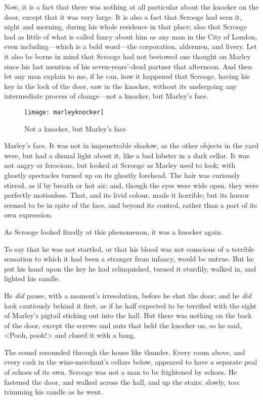 Now, it is a fact that there was nothing at all particular about the knocker on the door, except that it was very large. It is also a fact that Scrooge had seen it, night and morning, during his whole residence in that place; also that Scrooge had as little of what is called fancy about him as any man in the City of London, even including—which is a bold word—the corporation, aldermen, and livery. Let it also be borne in mind that Scrooge had not bestowed one thought on Marley since his last mention of his seven-years'-dead partner that afternoon. And then let any man explain to me, if he can, how it happened that Scrooge, having his key in the lock of the door, saw in the knocker, without its undergoing any intermediate process of change—not a knocker, but Marley's face.

\begin{figure}[t]
\centering
\texttt{[image: marleyknocker]}
\caption{Not a knocker, but Marley's face}
\end{figure}

Marley's face. It was not in impenetrable shadow, as the other objects in the yard were, but had a dismal light about it, like a bad lobster in a dark cellar. It was not angry or ferocious, but looked at Scrooge as Marley used to look; with ghostly spectacles turned up on its ghostly forehead. The hair was curiously stirred, as if by breath or hot air; and, though the eyes were wide open, they were perfectly motionless. That, and its livid colour, made it horrible; but its horror seemed to be in spite of the face, and beyond its control, rather than a part of its own expression.

As Scrooge looked fixedly at this phenomenon, it was a knocker again.

To say that he was not startled, or that his blood was not conscious of a terrible sensation to which it had been a stranger from infancy, would be untrue. But he put his hand upon the key he had relinquished, turned it sturdily, walked in, and lighted his can\-dle.

He \textit{did} pause, with a moment's irresolution, before he shut the door; and he \textit{did} look cautiously behind it first, as if he half expected to be terrified with the sight of Marley's pigtail sticking out into the hall. But there was nothing on the back of the door, except the screws and nuts that held the knocker on, so he said, <Pooh, pooh!> and closed it with a bang.

The sound resounded through the house like thunder. Every room above, and every cask in the wine-merchant's cellars below, appeared to have a separate peal of echoes of its own. Scrooge was not a man to be frightened by echoes. He fastened the door, and walked across the hall, and up the stairs: slowly, too: trimming his candle as he went.

